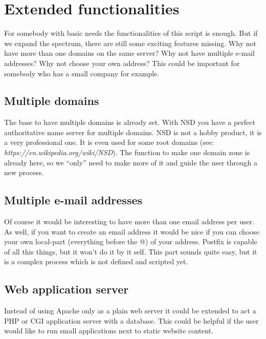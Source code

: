 \section{Extended functionalities}
For somebody with basic needs the functionalities of this script is enough. But if we expand the spectrum, there are still some exciting features missing. Why not have more than one domains on the same server? Why not have multiple e-mail addresses? Why not choose your own address? This could be important for somebody who has a small company for example.
\subsection{Multiple domains}
The base to have multiple domains is already set. With NSD you have a perfect authoritative name server for multiple domains. NSD is not a hobby product, it is a very professional one. It is even used for some root domains (see: \textit{https://en.wikipedia.org/wiki/NSD}). The function to make one domain zone is already here, so we ``only'' need to make more of it and guide the user through a new process. 
\subsection{Multiple e-mail addresses} \label{future_work_mail}
Of course it would be interesting to have more than one email address per user. As well, if you want to create an email address it would be nice if you can choose your own local-part (everything before the @) of your address. Postfix is capable of all this things, but it won't do it by it self. This part sounds quite easy, but it is a complex process which is not defined and scripted yet.
\subsection{Web application server} \label{future_work_web}
Instead of using Apache only as a plain web server it could be extended to act a PHP or CGI application server with a database. This could be helpful if the user would like to run small applications next to static website content.
